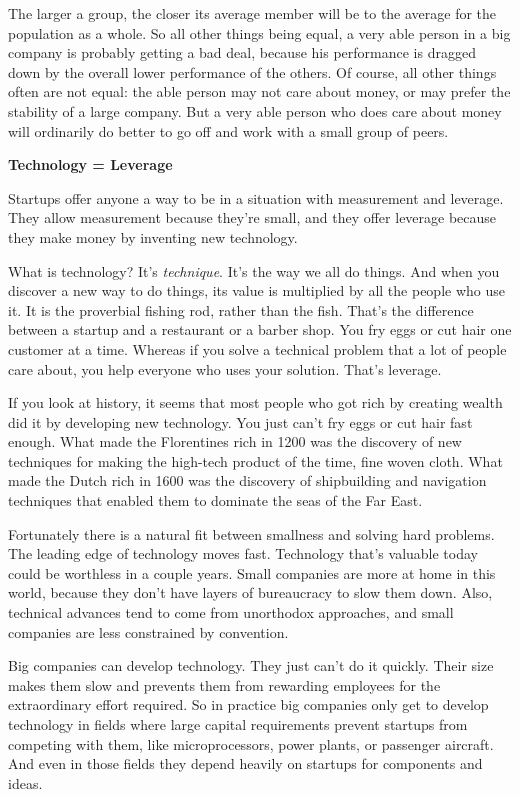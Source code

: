 \documentclass[12pt]{book}
\begin{document}
The larger a group, the closer its average member will be to the average
for the population as a whole. So all other things being equal, a very
able person in a big company is probably getting a bad deal, because his
performance is dragged down by the overall lower performance of the
others. Of course, all other things often are not equal: the able person
may not care about money, or may prefer the stability of a large
company. But a very able person who does care about money will
ordinarily do better to go off and work with a small group of peers.

\textbf{Technology = Leverage}

Startups offer anyone a way to be in a situation with measurement and
leverage. They allow measurement because they're small, and they offer
leverage because they make money by inventing new technology.

What is technology? It's \emph{technique}. It's the way we all do
things. And when you discover a new way to do things, its value is
multiplied by all the people who use it. It is the proverbial fishing
rod, rather than the fish. That's the difference between a startup and a
restaurant or a barber shop. You fry eggs or cut hair one customer at a
time. Whereas if you solve a technical problem that a lot of people care
about, you help everyone who uses your solution. That's leverage.

If you look at history, it seems that most people who got rich by
creating wealth did it by developing new technology. You just can't fry
eggs or cut hair fast enough. What made the Florentines rich in 1200 was
the discovery of new techniques for making the high-tech product of the
time, fine woven cloth. What made the Dutch rich in 1600 was the
discovery of shipbuilding and navigation techniques that enabled them to
dominate the seas of the Far East.

Fortunately there is a natural fit between smallness and solving hard
problems. The leading edge of technology moves fast. Technology that's
valuable today could be worthless in a couple years. Small companies are
more at home in this world, because they don't have layers of
bureaucracy to slow them down. Also, technical advances tend to come
from unorthodox approaches, and small companies are less constrained by
convention.

Big companies can develop technology. They just can't do it quickly.
Their size makes them slow and prevents them from rewarding employees
for the extraordinary effort required. So in practice big companies only
get to develop technology in fields where large capital requirements
prevent startups from competing with them, like microprocessors, power
plants, or passenger aircraft. And even in those fields they depend
heavily on startups for components and ideas.
\end{document}
